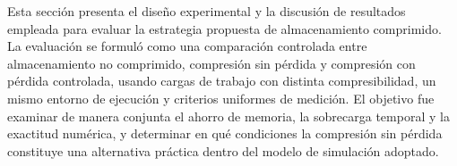 Esta sección presenta el diseño experimental y la discusión de resultados empleada para evaluar la estrategia propuesta de almacenamiento comprimido. La evaluación se formuló como una comparación controlada entre almacenamiento no comprimido, compresión sin pérdida y compresión con pérdida controlada, usando cargas de trabajo con distinta compresibilidad, un mismo entorno de ejecución y criterios uniformes de medición. El objetivo fue examinar de manera conjunta el ahorro de memoria, la sobrecarga temporal y la exactitud numérica, y determinar en qué condiciones la compresión sin pérdida constituye una alternativa práctica dentro del modelo de simulación adoptado.
